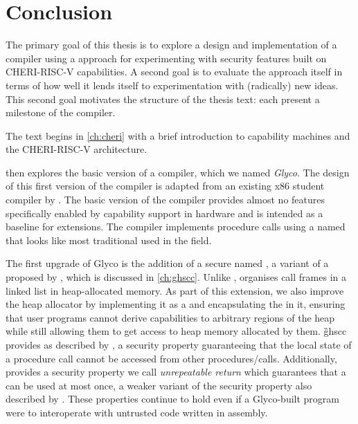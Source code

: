 \documentclass[main.tex]{subfiles}
\begin{document}
\onlyinsubfile{\mainmatter{}}

\chapter{Conclusion}
The primary goal of this thesis is to explore a design and implementation of a compiler using a  approach for experimenting with security features built on CHERI-RISC-V capabilities. A second goal is to evaluate the approach itself in terms of how well it lends itself to experimentation with (radically) new ideas. This second goal motivates the structure of the thesis text:  each present a milestone of the compiler.

The text begins in \cref{ch:cheri} with a brief introduction to capability machines and the CHERI-RISC-V architecture.

 then explores the basic version of a  compiler, which we named \emph{Glyco}. The design of this first version of the compiler is adapted from an existing x86 student compiler by \citet{compcourse}. The basic version of the compiler provides almost no features specifically enabled by capability support in hardware and is intended as a baseline for extensions. The compiler implements procedure calls using a  named  that looks like most traditional  used in the field.

The first upgrade of Glyco is the addition of a secure  named \emph{}, a variant of a  proposed by \citet{cerise}, which is discussed in \cref{ch:ghscc}. Unlike ,  organises call frames in a linked list in heap-allocated memory. As part of this extension, we also improve the heap allocator by implementing it as a  and encapsulating the  in it, ensuring that user programs cannot derive capabilities to arbitrary regions of the heap while still allowing them to get access to heap memory allocated by them. \G{ghscc} provides  as described by \citet[Section~1]{stktokens}, a security property guaranteeing that the local state of a procedure call cannot be accessed from other procedures/calls. Additionally,  provides a security property we call \emph{unrepeatable return} which guarantees that a  can be used at most once, a weaker variant of the  security property also described by \citet[Section~1]{stktokens}. These properties continue to hold even if a Glyco-built program were to interoperate with untrusted code written in assembly.
\end{document}
